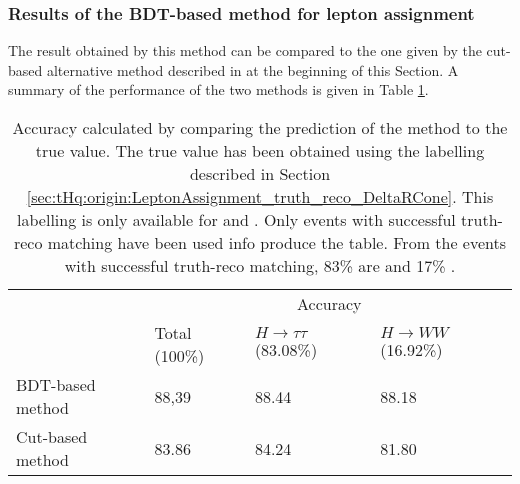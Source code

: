 \subsubsection{Results of the BDT-based method for lepton assignment}
\label{sec:ChaptH:Sig:LepAsign:SS:BDT:Results}


The result obtained by this method can be compared to the one given by the cut-based alternative method 
described in at the beginning of this Section. A summary of the performance of the two methods
is given in Table \ref{tab:dileptau:Assignment:MethodsSummary}.

\begin{table}[]
\centering
\begin{tabular}{l|lll|}
\cline{2-4}
 & \multicolumn{3}{c|}{Accuracy} \\ \cline{2-4} 
                                       & \multicolumn{1}{l|}{Total (100\%)} & \multicolumn{1}{l|}{$H\rightarrow \tau \tau$ (83.08\%)} & $H\rightarrow WW$ (16.92\%) \\ \hline
\multicolumn{1}{|l|}{BDT-based method} & \multicolumn{1}{l|}{88,39}         & \multicolumn{1}{l|}{88.44}             & 88.18         \\ \hline
\multicolumn{1}{|l|}{Cut-based method}       & \multicolumn{1}{l|}{83.86}         & \multicolumn{1}{l|}{84.24}             & 81.80         \\ \hline
\end{tabular}
\caption{Accuracy calculated by comparing the prediction of the method to the true value. 
The true value has been obtained using the labelling described in Section \ref{sec:tHq:origin:LeptonAssignment_truth_reco_DeltaRCone}. 
This labelling is only available for \Htautau and \HWW. Only events with successful truth-reco matching have been used info produce the table.
From the events with successful truth-reco matching, 83\% are \Htautau and 17\% \HWW.}
\label{tab:dileptau:Assignment:MethodsSummary}
\end{table}




 
 

